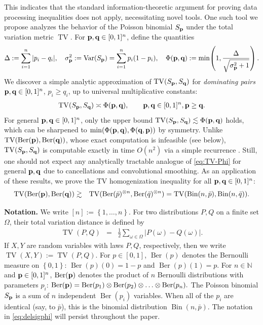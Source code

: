\documentclass[11pt]{amsart}
\theoremstyle{plain}
\theoremstyle{definition}
\DeclareMathOperator{\TV}{TV}
\DeclareMathOperator{\Bin}{Bin}
\DeclareMathOperator{\Ber}{Ber}
\DeclareMathOperator{\Var}{Var}
\newcommand{\N}{\mathbb{N}}
\renewcommand{\P}{\mathbb{P}}
\newcommand{\beqn}{\begin{eqnarray}}
\newcommand{\eeqn}{\end{eqnarray}}
\newcommand{\set}[1]{\left\{ #1 \right\}}
\newcommand{\mybin}[2]{\Bin(#1,#2)}
\newcommand{\hide}[1]{}
\renewcommand{\vec}[1]{\textup{{\bf #1}}}
\begin{document}
This indicates that the standard information-theoretic argument for proving
data processing inequalities does not apply, necessitating novel tools.
One such tool we propose
analyzes
the behavior of
the Poisson binomial
$S_{\vec{p}}$
under the total variation metric $\TV$.
For $\vec{p},\vec{q}\in[0,1]^n$, define the quantities
\beqn
\label{eq:delsigphi}
\Delta:=
\sum_{i=1}^n|p_i-q_i|
,
\quad
\sigma_{\vec{p}}^2:=\Var(S_{\vec{p}})=\sum_{i=1}^n p_i(1-p_i),
\quad
\Phi(\vec{p},\vec{q}):=
\min\!\left(1,\frac{\Delta}{\sqrt{\sigma_{\vec{p}}^2+1}}\right)
.
\eeqn
We discover
a simple analytic approximation of $\TV(S_{\vec{p}},S_{\vec{q}})$
for {\em dominating pairs} $\vec{p},\vec{q}\in[0,1]^n$, $p_i\ge q_i$,
up to universal multiplicative constants:
\beqn
\label{eq:TV-Phi}
\TV(S_{\vec{p}},S_{\vec{q}})\asymp\Phi(\vec{p},\vec{q}),
\qquad \vec{p},\vec{q}\in[0,1]^n, \vec{p}\ge \vec{q}.
\eeqn
For general $\vec{p},\vec{q}\in[0,1]^n$,
only the upper bound
$\TV(S_{\vec{p}},S_{\vec{q}})\lesssim\Phi(\vec{p},\vec{q})$ holds, which
can be sharpened to $\min(\Phi(\vec{p},\vec{q}),\Phi(\vec{q},\vec{p}))$ by symmetry.
Unlike
$\TV(\Ber(\vec{p}),\Ber(\vec{q}))$,
whose exact computation
is infeasible (see below),
$\TV(S_{\vec{p}},S_{\vec{q}})$
is computable
exactly
in time $O(n^2)$ via a simple recurrence
\cite[Section 5]{TangTang2023}\hide
{
One initializes
$f_0(0)=1$ and $f_0(k)=0$ for $k\neq 0$
and updates
\[
f_i(k)=(1-p_i)\,f_{i-1}(k)+p_i\,f_{i-1}(k-1),
\]
where by convention $f_{i-1}(-1)=0$ and $f_{i-1}(i)=0$.
After $n$ steps, $f_n(k)=\P(S_{\vec{p}}=k)$. An analogous calculation
is carried out for $S_{\vec{q}}$, from which $TV(S_{\vec{p}},S_{\vec{q}})$ is trivial to compute.
}.
Still,
one should not expect any analytically tractable analogue of
\eqref{eq:TV-Phi} for general $\vec{p},\vec{q}$ due to cancellations and convolutional smoothing.
As an application of these results, we prove the
TV homogenization inequality for all $\vec{p},\vec{q}\in[0,1]^n$:
\beqn
\label{eq:tv-homog}
\TV(\Ber(\vec{p}),\Ber(\vec{q}))
&\gtrsim&
\TV(
\Ber(\bar p)^{\otimes n}
,
\Ber(\bar q)^{\otimes n}
)
=
\TV(\mybin{n}{\bar p},\mybin{n}{\bar q})
.
\eeqn

\medskip\noindent\textbf{Notation.}
We write $[n]:=\set{1,\ldots,n}$.
For two distributions $P,Q$ on
a finite set
$\Omega$, their total variation
distance is defined by
\beqn
\label{eq:tv-def}
\TV(P,Q)
&=&
\frac12\sum_{\omega\in\Omega}|P(\omega)-Q(\omega)|
.
\eeqn
If $X,Y$ are random variables with laws $P,Q$, respectively,
then we write $\TV(X,Y):=\TV(P,Q)$.
For $p\in[0,1]$,
$\Ber(p)$
denotes
the Bernoulli measure on $\set{0,1}$:
$\Ber(p)(0)=1- p$
and
$\Ber(p)(1)=p$.
For $n\in\N$ and $\vec{p}
\in[0,1]^n$,
$\Ber(\vec{p})$ denotes
the product of $n$ Bernoulli distributions with parameters $p_i$:
$
\Ber(\vec{p}) = \Ber(p_1) \otimes \Ber(p_2)\otimes \ldots \otimes \Ber(p_n).
$
The Poisson binomial $S_{\vec{p}}$ is a sum of $n$ independent $\Ber(p_i)$
variables.
When all of the $p_i$ are identical (say, to $\bar p$),
this is the binomial distribution $\mybin{n}{\bar p}$.
The notation in \eqref{eq:delsigphi}
will persist throughout the paper.
\end{document}
